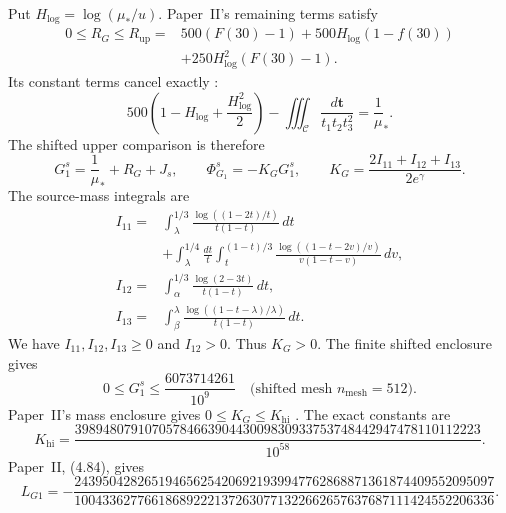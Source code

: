 Put $H_{\log}=\log(\mu_*/u)$.
Paper~II's remaining terms satisfy
\begin{equation}\label{eq:retB-G-residual}
\begin{aligned}
 0\le R_G\le R_{\mathrm{up}}
 ={}&500(F(30)-1)+500H_{\log}(1-f(30))\\
    &+250H_{\log}^2(F(30)-1).
\end{aligned}
\end{equation}
Its constant terms cancel exactly
\cite[(4.73)--(4.75)]{PaperII}:
\begin{equation}\label{eq:retB-G-cancellation}
 500\left(1-H_{\log}+\frac{H_{\log}^2}{2}\right)
 -\iiint_{\mathcal C}\frac{d\mathbf t}{t_1t_2t_3^2}
 =\frac1\mu_*.
\end{equation}
The shifted upper comparison is therefore
\begin{equation}\label{eq:retB-G-profile}
 G_1^s=\frac1\mu_*+R_G+J_s,
 \qquad
 \Phi_{G_1}^s=-K_GG_1^s,
 \qquad
 K_G=\frac{2I_{11}+I_{12}+I_{13}}{2e^\gamma}.
\end{equation}
The source-mass integrals are \cite[(4.77)]{PaperII}
\begin{equation}\label{eq:retB-G-masses}
\begin{aligned}
 I_{11}={}&\int_\lambda^{1/3}
          \frac{\log((1-2t)/t)}{t(1-t)}\,dt\\
 &+\int_\lambda^{1/4}\frac{dt}{t}
        \int_t^{(1-t)/3}
          \frac{\log((1-t-2v)/v)}{v(1-t-v)}\,dv,\\
 I_{12}={}&\int_\alpha^{1/3}
          \frac{\log(2-3t)}{t(1-t)}\,dt,\\
 I_{13}={}&\int_\beta^\lambda
          \frac{\log((1-t-\lambda)/\lambda)}{t(1-t)}\,dt.
\end{aligned}
\end{equation}
We have $I_{11},I_{12},I_{13}\ge0$ and $I_{12}>0$.
Thus $K_G>0$.
The finite shifted enclosure gives
\begin{equation}\label{eq:retB-G-finite}
 0\le G_1^s\le\frac{6073714261}{10^9}
 \quad\text{(shifted mesh $n_{\mathrm{mesh}}=512$)}.
\end{equation}
Paper~II's mass enclosure gives $0\le K_G\le K_{\mathrm{hi}}$
\cite[(A.10d)]{PaperII}. The exact constants are
\begin{equation}\label{eq:retB-exact-Khi}
 K_{\mathrm{hi}}=
 \frac{3989480791070578466390443009830933753748442947478110112223}{10^{58}}.
\end{equation}
Paper~II, (4.84), gives
\begin{equation}\label{eq:retB-exact-LG1}
 L_{G1}=-
 \frac{243950428265194656254206921939947762868871361874409552095097}
 {100433627766186892221372630771322662657637687111424552206336}.
\end{equation}
